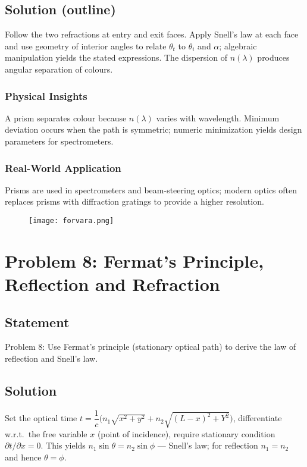 \documentclass[12pt,a4paper]{article}
\begin{document}
\subsection*{Solution (outline)}
Follow the two refractions at entry and exit faces. Apply Snell's law at each face and use geometry of interior angles to relate $\theta_t$ to $\theta_i$ and $\alpha$; algebraic manipulation yields the stated expressions. The dispersion of $n(\lambda)$ produces angular separation of colours.

\subsubsection*{Physical Insights}
A prism separates colour because $n(\lambda)$ varies with wavelength. Minimum deviation occurs when the path is symmetric; numeric minimization yields design parameters for spectrometers.

\subsubsection*{Real-World Application}
Prisms are used in spectrometers and beam-steering optics; modern optics often replaces prisms with diffraction gratings to provide a  higher resolution.

\begin{figure}
  \texttt{[image: forvara.png]}
\end{figure}

\newpage

\section{Problem 8: Fermat's Principle, Reflection and Refraction}
\subsection*{Statement }
Problem 8: Use Fermat's principle (stationary optical path) to derive the law of reflection and Snell's law.

\subsection*{Solution}
Set the optical time $t=\dfrac{1}{c}\bigl(n_1\sqrt{x^2+y^2}+n_2\sqrt{(L-x)^2+Y^2}\bigr)$, differentiate w.r.t.\ the free variable $x$ (point of incidence), require stationary condition $\partial t/\partial x=0$. This yields $n_1\sin\theta=n_2\sin\phi$ — Snell's law; for reflection $n_1=n_2$ and hence $\theta=\phi$.
\end{document}
